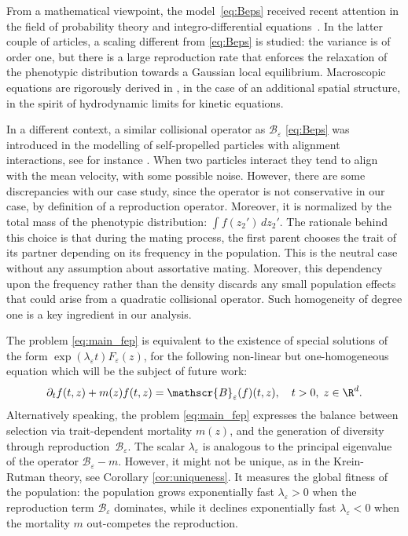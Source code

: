 \documentclass[10pt]{amsart}
\let\mathcal\mathscr
\newcommand{\cB}{\mathcal{B}}
\theoremstyle{plain}
\theoremstyle{definition}
\let\eps\varepsilon
\begin{document}
From a mathematical viewpoint, the model~\eqref{eq:Beps} received recent attention in the field of probability theory \cite{weberinfinitesimal} and integro-differential equations~\cite{raoulmirrahimiinfinitesimal,Raoul}.
In the latter couple of articles, a scaling different from \eqref{eq:Beps} is studied: the variance is of order one, but there is a large reproduction rate that enforces the relaxation of the phenotypic distribution towards a Gaussian local equilibrium. Macroscopic equations are rigorously derived in \cite{Raoul}, in the case of an additional spatial structure, in the spirit of hydrodynamic limits for kinetic equations.

In a different context, a similar collisional operator as $\cB_\eps$ \eqref{eq:Beps} was introduced in the modelling of self-propelled particles with alignment interactions, see for instance \cite{bertin_boltzmann_2006,degond_local_2014}. When two particles interact they tend to align with the mean velocity, with some possible noise. However, there are some discrepancies with our case study, since the operator is not conservative in our case, by definition of a reproduction operator. Moreover, it is normalized by the total mass of the phenotypic distribution: $\int f(z_2')\, d z_2'$. The rationale behind this choice is that during the mating process, the first parent chooses the trait of its partner depending on its frequency in the population. This is the neutral case without any assumption about assortative mating. Moreover, this dependency upon the frequency rather than the density discards any small population effects that could arise from a quadratic collisional operator. Such homogeneity of degree
one is a key ingredient in our analysis.

The problem \eqref{eq:main_fep} is equivalent to the existence of special solutions of the form $\exp (\lambda_\eps t) F_\eps(z)$, for the following non-linear but one-homogeneous equation which will be the subject of future work:
\begin{equation}\label{eq:time marching}
\partial_t f(t,z) + m(z)f(t,z) = \cB_\eps(f)(t,z), \quad t>0,\; z\in \R^d.
\end{equation}
Alternatively speaking, the problem \eqref{eq:main_fep} expresses the balance between selection via trait-dependent mortality $m(z)$, and the generation of diversity through reproduction~$\cB_\eps$. The scalar $\lambda_\eps$ is analogous to the principal eigenvalue of the operator $\cB_\eps - m$. However, it might not be unique, as in the Krein-Rutman theory, see Corollary \ref{cor:uniqueness}. It measures the global fitness of the population: the population grows exponentially fast $\lambda_\eps>0$ when the reproduction term $\cB_\eps$ dominates, while it declines exponentially fast $\lambda_\eps<0$ when the mortality $m$ out-competes the reproduction.
\end{document}
